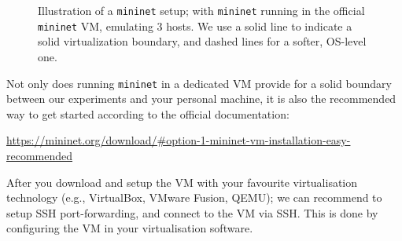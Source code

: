 \documentclass{article}
\newcommand{\mininet}{\texttt{mininet}}
\begin{document}
\begin{figure}[htbp!]
\centering



\caption{Illustration of a \mininet{} setup; with \mininet{} running
in the official \mininet{} VM, emulating 3 hosts. We use a solid line
to indicate a solid virtualization boundary, and dashed lines for a
softer, OS-level one. }

\label{fig:mininet-basics}

\end{figure}

Not only does running \mininet{} in a dedicated VM provide for a solid
boundary between our experiments and your personal machine, it is also
the recommended way to get started according to the official
documentation:

\begin{center}

\url{https://mininet.org/download/\#option-1-mininet-vm-installation-easy-recommended}

\end{center}

After you download and setup the VM with your favourite virtualisation
technology (e.g., VirtualBox, VMware Fusion, QEMU); we can recommend
to setup SSH port-forwarding, and connect to the VM via SSH. This is
done by configuring the VM in your virtualisation software.
\end{document}
